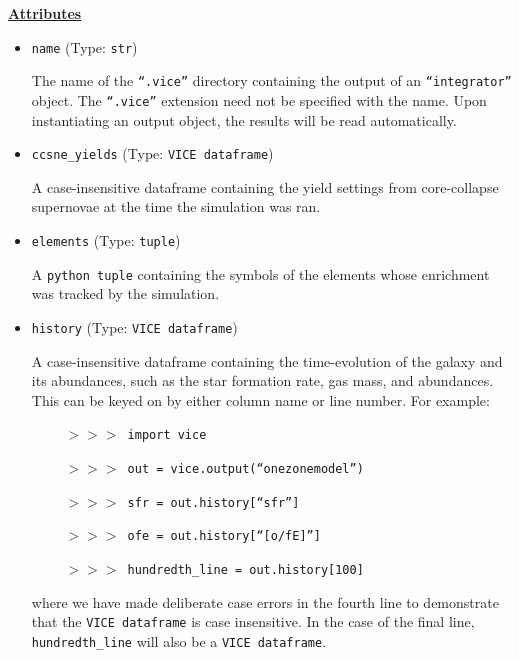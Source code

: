 \documentclass{report}
\begin{document}
\par\null\par\noindent
\underline{\textbf{Attributes}} 
\begin{itemize}
	\item{ %
		\texttt{name} (Type: \texttt{str}) 
		\par 
		The name of the \texttt{``.vice''} directory containing the output of 
		an \texttt{``integrator''} object. The \texttt{``.vice''} extension 
		need not be specified with the name. Upon instantiating an output 
		object, the results will be read automatically. 
	}

	\item{ %
		\texttt{ccsne\_yields} (Type: \texttt{VICE dataframe}) 
		\par 
		A case-insensitive dataframe containing the yield settings from 
		core-collapse supernovae at the time the simulation was ran. 
	}

	\item{ %
		\texttt{elements} (Type: \texttt{tuple}) 
		\par 
		A \texttt{python tuple} containing the symbols of the elements whose 
		enrichment was tracked by the simulation. 
	}

	\item{ %
		\texttt{history} (Type: \texttt{VICE dataframe})
		\par 
		A case-insensitive dataframe containing the time-evolution of the 
		galaxy and its abundances, such as the star formation rate, gas mass, 
		and abundances. This can be keyed on by either column name or 
		line number. For example: 
		\par$\qquad$ 
		\texttt{$>>>$ import vice} 
		\par$\qquad$
		\texttt{$>>>$ out = vice.output(``onezonemodel'')}
		\par$\qquad$
		\texttt{$>>>$ sfr = out.history[``sfr'']} 
		\par$\qquad$
		\texttt{$>>>$ ofe = out.history[``[o/fE]'']}
		\par$\qquad$ 
		\texttt{$>>>$ hundredth\_line = out.history[100]}
		\par\noindent
		where we have made deliberate case errors in the fourth line to 
		demonstrate that the \texttt{VICE dataframe} is case insensitive. In 
		the case of the final line, \texttt{hundredth\_line} will also be a 
		\texttt{VICE dataframe}. 
	}


\end{itemize}
\end{document}
